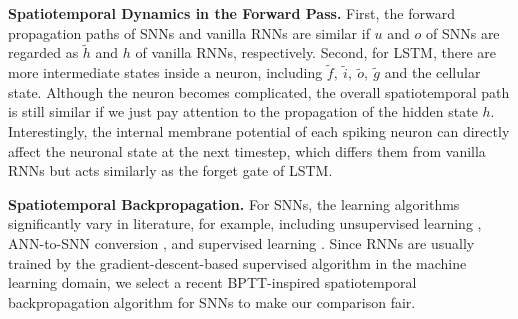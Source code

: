 \documentclass[journal,10pt,twocolumn]{IEEETran}
\begin{document}
\textbf{Spatiotemporal Dynamics in the Forward Pass.} First, the forward propagation paths of SNNs and vanilla RNNs are similar if $u$ and $o$ of SNNs are regarded as $\tilde{h}$ and $h$ of vanilla RNNs, respectively. Second, for LSTM, there are more intermediate states inside a neuron, including $\tilde{f},~\tilde{i},~\tilde{o},~\tilde{g}$ and the cellular state. Although the neuron becomes complicated, the overall spatiotemporal path is still similar if we just pay attention to the propagation of the hidden state $h$. Interestingly, the internal membrane potential of each spiking neuron can directly affect the neuronal state at the next timestep, which differs them from vanilla RNNs but acts similarly as the forget gate of LSTM.

\textbf{Spatiotemporal Backpropagation.} For SNNs, the learning algorithms significantly vary in literature, for example, including unsupervised learning \cite{diehl2015unsupervised}, ANN-to-SNN conversion \cite{diehl2015fast}, and supervised learning \cite{lee2016training,wu2018spatio,wu2019direct}. Since RNNs are usually trained by the gradient-descent-based supervised algorithm in the machine learning domain, we select a recent BPTT-inspired spatiotemporal backpropagation algorithm \cite{wu2018spatio,wu2019direct} for SNNs to make our comparison fair. 
\end{document}
